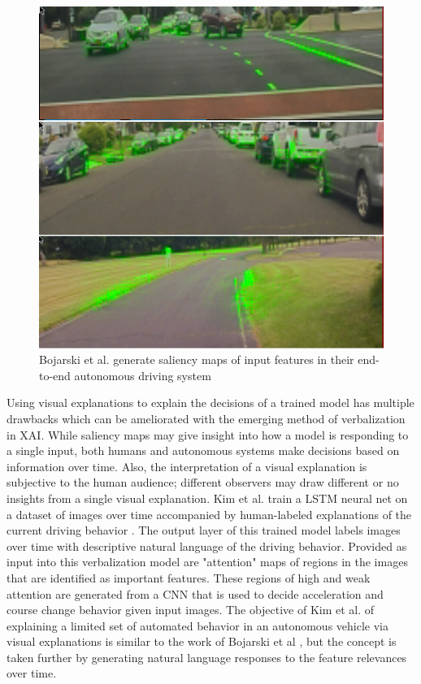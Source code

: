 \begin{figure}
    \includegraphics[width=\textwidth]{media/bojarski2017.png}
    \caption{Bojarski et al. generate saliency maps of input features in their end-to-end autonomous driving system \cite{Bojarski2017ExplainingHA}}
    \label{fig:bojarski2017}
\end{figure}

Using visual explanations to explain the decisions of a trained model has multiple drawbacks which can be ameliorated with the emerging method of verbalization in XAI.  While saliency maps may give insight into how a model is responding to a single input, both humans and autonomous systems make decisions based on information over time.  Also, the interpretation of a visual explanation is subjective to the human audience; different observers may draw different or no insights from a single visual explanation.  Kim et al. train a LSTM neural net on a dataset of images over time accompanied by human-labeled explanations of the current driving behavior \cite{kim2018textual}.  The output layer of this trained model labels images over time with descriptive natural language of the driving behavior.  Provided as input into this verbalization model are "attention" maps of regions in the images that are identified as important features.  These regions of high and weak attention are generated from a CNN that is used to decide acceleration and course change behavior given input images.  The objective of Kim et al. of explaining a limited set of automated behavior in an autonomous vehicle via visual explanations is similar to the work of Bojarski et al \cite{Bojarski2017ExplainingHA}, but the concept is taken further by generating natural language responses to the feature relevances over time.

